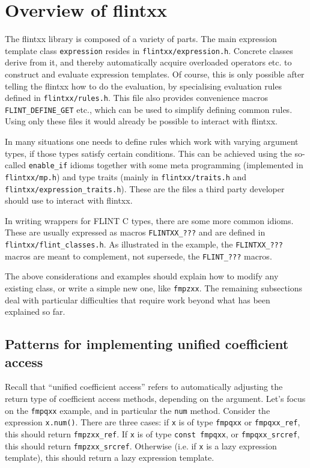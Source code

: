 \documentclass[a4paper,10pt]{book}
\newcommand{\code}{\lstinline}
\begin{document}
{{\section{Overview of flintxx}

The flintxx library is composed of a variety of parts. The main expression
template class \code{expression} resides in \code{flintxx/expression.h}.
Concrete classes derive from it, and thereby automatically acquire overloaded
operators etc. to construct and evaluate expression templates. Of course, this
is only possible after telling the flintxx how to do the evaluation, by
specialising evaluation rules defined in \code{flintxx/rules.h}. This file also
provides convenience macros \code{FLINT_DEFINE_GET} etc., which can be used to
simplify defining common rules. Using only these files it would already be
possible to interact with flintxx.

In many situations one needs to define rules which work with varying argument
types, if those types satisfy certain conditions. This can be achieved using the
so-called \code{enable_if} idioms together with some meta programming
(implemented in \code{flintxx/mp.h}) and type traits (mainly in
\code{flintxx/traits.h} and \code{flintxx/expression_traits.h}). These are the
files a third party developer should use to interact with flintxx.

In writing wrappers for FLINT C types, there are some more common idioms. These
are usually expressed as macros \code{FLINTXX_???} and are defined in
\code{flintxx/flint_classes.h}. As illustrated in the example, the
\code{FLINTXX_???} macros are meant to complement, not supersede, the
\code{FLINT_???} macros.

The above considerations and examples should explain how to modify any existing
class, or write a simple new one, like \code{fmpzxx}. The remaining subsections
deal with particular difficulties that require work beyond what has been
explained so far.

\subsection{Patterns for implementing unified coefficient access}

Recall that ``unified coefficient access'' refers to automatically adjusting the
return type of coefficient access methods, depending on the argument. Let's
focus on the \code{fmpqxx} example, and in particular the \code{num} method.
Consider the expression \code{x.num()}. There are three cases: if \code{x} is of
type \code{fmpqxx} or \code{fmpqxx_ref}, this should return \code{fmpzxx_ref}.
If \code{x} is of type \code{const fmpqxx}, or \code{fmpqxx_srcref}, this should
return \code{fmpzxx_srcref}. Otherwise (i.e. if \code{x} is a lazy expression
template), this should return a lazy expression template.

}}
\end{document}

